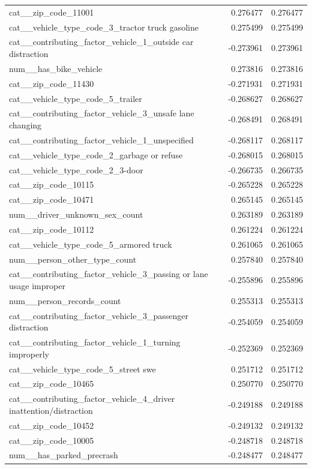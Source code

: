 \begin{tabular}{lrr}
cat__zip_code_11001 & 0.276477 & 0.276477 \\
cat__vehicle_type_code_3_tractor truck gasoline & 0.275499 & 0.275499 \\
cat__contributing_factor_vehicle_1_outside car distraction & -0.273961 & 0.273961 \\
num__has_bike_vehicle & 0.273816 & 0.273816 \\
cat__zip_code_11430 & -0.271931 & 0.271931 \\
cat__vehicle_type_code_5_trailer & -0.268627 & 0.268627 \\
cat__contributing_factor_vehicle_3_unsafe lane changing & -0.268491 & 0.268491 \\
cat__contributing_factor_vehicle_1_unspecified & -0.268117 & 0.268117 \\
cat__vehicle_type_code_2_garbage or refuse & -0.268015 & 0.268015 \\
cat__vehicle_type_code_2_3-door & -0.266735 & 0.266735 \\
cat__zip_code_10115 & -0.265228 & 0.265228 \\
cat__zip_code_10471 & 0.265145 & 0.265145 \\
num__driver_unknown_sex_count & 0.263189 & 0.263189 \\
cat__zip_code_10112 & 0.261224 & 0.261224 \\
cat__vehicle_type_code_5_armored truck & 0.261065 & 0.261065 \\
num__person_other_type_count & 0.257840 & 0.257840 \\
cat__contributing_factor_vehicle_3_passing or lane usage improper & -0.255896 & 0.255896 \\
num__person_records_count & 0.255313 & 0.255313 \\
cat__contributing_factor_vehicle_3_passenger distraction & -0.254059 & 0.254059 \\
cat__contributing_factor_vehicle_1_turning improperly & -0.252369 & 0.252369 \\
cat__vehicle_type_code_5_street swe & 0.251712 & 0.251712 \\
cat__zip_code_10465 & 0.250770 & 0.250770 \\
cat__contributing_factor_vehicle_4_driver inattention/distraction & -0.249188 & 0.249188 \\
cat__zip_code_10452 & -0.249132 & 0.249132 \\
cat__zip_code_10005 & -0.248718 & 0.248718 \\
num__has_parked_precrash & -0.248477 & 0.248477 \\

\end{tabular}
